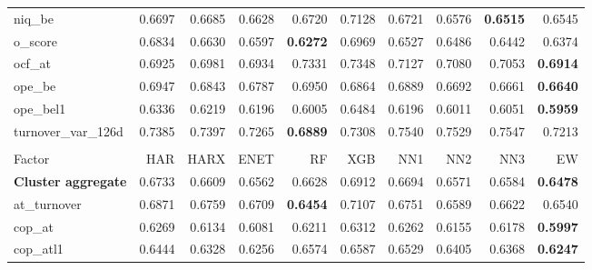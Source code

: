\begin{longtable}{>{\raggedright\arraybackslash}p{2.6cm}rrrrrrrrr}
niq\_be & 0.6697 & \cellcolor{blue!10}0.6685 & \cellcolor{blue!10}0.6628 & 0.6720 & 0.7128 & 0.6721 & \cellcolor{blue!10}0.6576 & \textbf{\cellcolor{blue!10}0.6515} & \cellcolor{blue!10}0.6545 \\
o\_score & 0.6834 & \cellcolor{blue!10}0.6630 & \cellcolor{blue!10}0.6597 & \textbf{\cellcolor{blue!10}0.6272} & 0.6969 & \cellcolor{blue!10}0.6527 & \cellcolor{blue!10}0.6486 & \cellcolor{blue!10}0.6442 & \cellcolor{blue!10}0.6374 \\
ocf\_at & 0.6925 & 0.6981 & 0.6934 & 0.7331 & 0.7348 & 0.7127 & 0.7080 & 0.7053 & \textbf{\cellcolor{blue!10}0.6914} \\
ope\_be & 0.6947 & \cellcolor{blue!10}0.6843 & \cellcolor{blue!10}0.6787 & 0.6950 & \cellcolor{blue!10}0.6864 & \cellcolor{blue!10}0.6889 & \cellcolor{blue!10}0.6692 & \cellcolor{blue!10}0.6661 & \textbf{\cellcolor{blue!10}0.6640} \\
ope\_bel1 & 0.6336 & \cellcolor{blue!10}0.6219 & \cellcolor{blue!10}0.6196 & \cellcolor{blue!10}0.6005 & 0.6484 & \cellcolor{blue!10}0.6196 & \cellcolor{blue!10}0.6011 & \cellcolor{blue!10}0.6051 & \textbf{\cellcolor{blue!10}0.5959} \\
turnover\_var\_126d & 0.7385 & 0.7397 & \cellcolor{blue!10}0.7265 & \textbf{\cellcolor{blue!10}0.6889} & \cellcolor{blue!10}0.7308 & 0.7540 & 0.7529 & 0.7547 & \cellcolor{blue!10}0.7213 \\
\hline
\multicolumn{10}{@{}l}{\textit{Panel I. Quality}} \\
\hline
Factor & HAR & HARX & ENET & RF & XGB & NN1 & NN2 & NN3 & EW \\
\hline
\textbf{Cluster aggregate} & 0.6733 & \cellcolor{blue!10}0.6609 & \cellcolor{blue!10}0.6562 & \cellcolor{blue!10}0.6628 & 0.6912 & \cellcolor{blue!10}0.6694 & \cellcolor{blue!10}0.6571 & \cellcolor{blue!10}0.6584 & \textbf{\cellcolor{blue!10}0.6478} \\
at\_turnover & 0.6871 & \cellcolor{blue!10}0.6759 & \cellcolor{blue!10}0.6709 & \textbf{\cellcolor{blue!10}0.6454} & 0.7107 & \cellcolor{blue!10}0.6751 & \cellcolor{blue!10}0.6589 & \cellcolor{blue!10}0.6622 & \cellcolor{blue!10}0.6540 \\
cop\_at & 0.6269 & \cellcolor{blue!10}0.6134 & \cellcolor{blue!10}0.6081 & \cellcolor{blue!10}0.6211 & 0.6312 & \cellcolor{blue!10}0.6262 & \cellcolor{blue!10}0.6155 & \cellcolor{blue!10}0.6178 & \textbf{\cellcolor{blue!10}0.5997} \\
cop\_atl1 & 0.6444 & \cellcolor{blue!10}0.6328 & \cellcolor{blue!10}0.6256 & 0.6574 & 0.6587 & 0.6529 & \cellcolor{blue!10}0.6405 & \cellcolor{blue!10}0.6368 & \textbf{\cellcolor{blue!10}0.6247} \\

\end{longtable}

